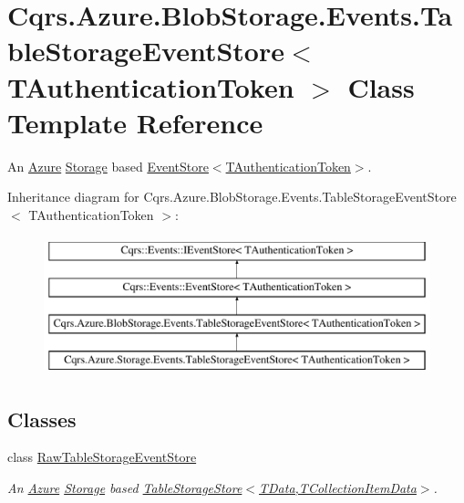 \hypertarget{classCqrs_1_1Azure_1_1BlobStorage_1_1Events_1_1TableStorageEventStore}{}\section{Cqrs.\+Azure.\+Blob\+Storage.\+Events.\+Table\+Storage\+Event\+Store$<$ T\+Authentication\+Token $>$ Class Template Reference}
\label{classCqrs_1_1Azure_1_1BlobStorage_1_1Events_1_1TableStorageEventStore}


An \hyperlink{namespaceCqrs_1_1Azure}{Azure} \hyperlink{namespaceCqrs_1_1Azure_1_1Storage}{Storage} based \hyperlink{classCqrs_1_1Events_1_1EventStore_a6346cb2aea4c5b4e740dc6cfb15abab8_a6346cb2aea4c5b4e740dc6cfb15abab8}{Event\+Store$<$\+T\+Authentication\+Token$>$}.  


Inheritance diagram for Cqrs.\+Azure.\+Blob\+Storage.\+Events.\+Table\+Storage\+Event\+Store$<$ T\+Authentication\+Token $>$\+:\begin{figure}[H]
\begin{center}
\leavevmode
\includegraphics[height=4.000000cm]{classCqrs_1_1Azure_1_1BlobStorage_1_1Events_1_1TableStorageEventStore}
\end{center}
\end{figure}
\subsection*{Classes}
\begin{DoxyCompactItemize}
\item 
class \hyperlink{classCqrs_1_1Azure_1_1BlobStorage_1_1Events_1_1TableStorageEventStore_1_1RawTableStorageEventStore}{Raw\+Table\+Storage\+Event\+Store}
\begin{DoxyCompactList}\small\item\em An \hyperlink{namespaceCqrs_1_1Azure}{Azure} \hyperlink{namespaceCqrs_1_1Azure_1_1Storage}{Storage} based \hyperlink{classCqrs_1_1Azure_1_1BlobStorage_1_1TableStorageStore_aabc36bc46ffb22b716cc7769a641cfab_aabc36bc46ffb22b716cc7769a641cfab}{Table\+Storage\+Store$<$\+T\+Data,\+T\+Collection\+Item\+Data$>$}. \end{DoxyCompactList}\end{DoxyCompactItemize}
